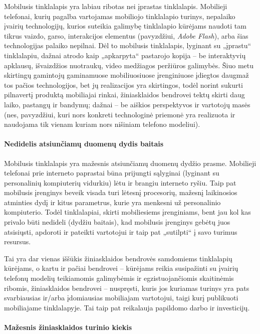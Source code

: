 \documentclass[kursinis-darbas]{vukf}
\begin{document}
Mobilusis tinklalapis yra labiau ribotas nei įprastas tinklalapis. Mobilieji telefonai, kurių pagalba vartojamas mobiliojo tinklalapio turinys, nepalaiko įvairių technologijų, kurios suteikia galimybę tinklalapio kūrėjams naudoti tam tikrus vaizdo, garso, interakcijos elementus (pavyzdžiui, \emph{Adobe Flash}), arba šias technologijas palaiko nepilnai. Dėl to mobilusis tinklalapis, lyginant su „įprastu“ tinklalapiu, dažnai atrodo kaip „apkarpyta“ pastarojo kopija – be interaktyvių apklausų, išvaizdžios nuotraukų, video medžiagos peržiūros galimybės. Šiuo metu skirtingų gamintojų gaminamuose mobiliuosiuose įrenginiuose įdiegtos daugmaž tos pačios technologijos, bet jų realizacijos yra skirtingos, todėl norint sukurti pilnavertį produktą mobiliajai rinkai, žiniasklaidos bendrovei tektų skirti daug laiko, pastangų ir bandymų; dažnai – be aiškios perspektyvos ir vartotojų masės (nes, pavyzdžiui, kuri nors konkreti technologinė priemonė yra realizuota ir naudojama tik vienam kuriam nors nišiniam telefono modeliui).

\paragraph{Nedidelis atsiunčiamų duomenų dydis baitais}
\label{sec:nedidelis_atsiunciamu_duomenu_dydis_baitais}

Mobilusis tinklalapis yra mažesnis atsiunčiamų duomenų dydžio prasme. Mobilieji telefonai prie interneto paprastai būna prijungti sąlyginai (lyginant su personalinių kompiuterių vidurkiu) lėtu ir brangiu interneto ryšiu. Taip pat mobilusis įrenginys beveik visada turi lėtesnį procesorių, mažesnį laikinosios atminties dydį ir kitus parametrus, kurie yra menkesni už personalinio kompiuterio. Todėl tinklalapiai, skirti mobiliesiems įrenginiams, bent jau kol kas privalo būti nedideli (dydžiu baitais), kad mobilusis įrenginys gebėtų juos atsisiųsti, apdoroti ir pateikti vartotojui ir taip pat „sutilpti“ į savo turimus resursus.

Tai yra dar vienas iššūkis žiniasklaidos bendrovės samdomiems tinklalapių kūrėjams, o kartu ir pačiai bendrovei – kūrėjams reikia susipažinti su įvairių telefonų modelių teikiamomis galimybėmis ir egzistuojančiomis skaitinėmis ribomis, žiniasklaidos bendrovei – nuspręsti, kuris jos kuriamas turinys yra pats svarbiausias ir/arba įdomiausias mobiliajam vartotojui, taigi kurį publikuoti mobiliajame tinklalapyje. Tai taip pat reikalauja papildomo darbo ir investicijų.

\paragraph{Mažesnis žiniasklaidos turinio kiekis}
\end{document}
